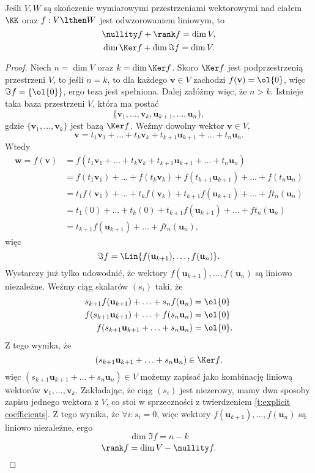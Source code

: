 \begin{theorem}[o rzędzie]
    \label{t:rank-nullity}
    Jeśli $V, W$ są skończenie wymiarowymi przestrzeniami wektorowymi nad ciałem $\KK$ oraz $f : V \lthen W$ jest odwzorowaniem liniowym, to
    \[ \nullity f + \rank f = \dim V, \]
    \[ \dim \Ker f + \dim \Im f = \dim V. \]
\end{theorem}
\begin{proof}
    Niech $n = \dim V$ oraz $k = \dim \Ker f$. Skoro $\Ker f$ jest podprzestrzenią przestrzeni $V$, to jeśli $n = k$, to dla każdego $\mathbf{v} \in V$ zachodzi $f(\mathbf{v}) = \ol{0}$, więc $\Im f = \{\ol{0}\}$, ergo teza jest spełniona. Dalej załóżmy więc, że $n > k$. Istnieje taka baza przestrzeni $V$, która ma postać
    \[ \{\mathbf{v}_1, \ldots, \mathbf{v}_k, \mathbf{u}_{k+1}, \ldots, \mathbf{u}_n\}, \]
    gdzie $\{\mathbf{v}_1, \ldots, \mathbf{v}_k\}$ jest bazą $\Ker f$. Weźmy dowolny wektor $\mathbf{v} \in V,$
    \[ \mathbf{v} = t_1\mathbf{v}_1 + \ldots + t_k\mathbf{v}_k + t_{k+1}\mathbf{u}_{k+1} + \ldots + t_n\mathbf{u}_n. \]
    Wtedy
    \begin{align*}
        \mathbf{w} = f(\mathbf{v}) &= f(t_1\mathbf{v}_1 + \ldots + t_k\mathbf{v}_k + t_{k+1}\mathbf{u}_{k+1} + \ldots + t_n\mathbf{u}_n) \\
            &= f(t_1\mathbf{v}_1) + \ldots + f(t_k\mathbf{v}_k) + f(t_{k+1}\mathbf{u}_{k+1}) + \ldots + f(t_n\mathbf{u}_n) \\
            &= t_1f(\mathbf{v}_1) + \ldots + t_kf(\mathbf{v}_k) + t_{k+1}f(\mathbf{u}_{k+1}) + \ldots + ft_n(\mathbf{u}_n) \\
            &= t_1(0) + \ldots + t_k(0) + t_{k+1}f(\mathbf{u}_{k+1}) + \ldots + ft_n(\mathbf{u}_n) \\
            &= t_{k+1}f(\mathbf{u}_{k+1}) + \ldots + ft_n(\mathbf{u}_n),
    \end{align*}
    więc
    \[ \Im f = \Lin\{f(\mathbf{u}_{k+1}), \ldots, f(\mathbf{u}_n)\}. \]
    Wystarczy już tylko udowodnić, że wektory $f(\mathbf{u}_{k+1}), \ldots, f(\mathbf{u}_n)$ są liniowo niezależne. Weźmy ciąg skalarów $(s_i)$ taki, że
    \begin{align*}
        s_{k+1}f(\mathbf{u}_{k+1}) + \ldots + s_nf(\mathbf{u}_n) &= \ol{0} \\
        f(s_{k+1}\mathbf{u}_{k+1}) + \ldots + f(s_n\mathbf{u}_n) &= \ol{0} \\
        f(s_{k+1}\mathbf{u}_{k+1} + \ldots + s_n\mathbf{u}_n) &= \ol{0}.
    \end{align*}
    Z tego wynika, że
    \[ (s_{k+1}\mathbf{u}_{k+1} + \ldots + s_n\mathbf{u}_n) \in \Ker f, \]
    więc $(s_{k+1}\mathbf{u}_{k+1} + \ldots + s_n\mathbf{u}_n) \in V$ możemy zapisać jako kombinację liniową wektorów $\mathbf{v}_1, \ldots, \mathbf{v}_k$. Zakładając, że ciąg $(s_i)$ jest niezerowy, mamy dwa sposoby zapisu jednego wektora z $V$, co stoi w sprzeczności z twierdzeniem \ref{t:explicit coefficients}. Z tego wynika, że $\forall i : s_i = 0$, więc wektory $f(\mathbf{u}_{k+1}), \ldots, f(\mathbf{u}_n)$ są liniowo niezależne, ergo
    \[ \dim \Im f = n - k \]
    \[ \rank f = \dim V - \nullity f. \]
\end{proof}

